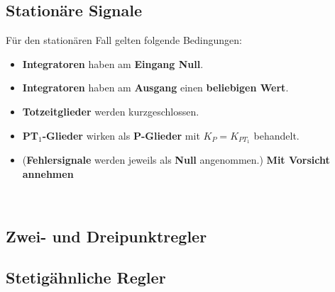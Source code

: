     
    \begin{minipage}{16cm}
    \subsection{Stationäre Signale}
	Für den stationären Fall gelten folgende Bedingungen:
	\begin{itemize}
    	\item \textbf{Integratoren} haben am \textbf{Eingang Null}.
    	\item \textbf{Integratoren} haben am \textbf{Ausgang} einen \textbf{beliebigen Wert}.
    	\item \textbf{Totzeitglieder} werden kurzgeschlossen.
    	\item \textbf{PT$_1$-Glieder} wirken als \textbf{P-Glieder} mit $K_P = K_{PT_1}$ behandelt.
    	\item (\textbf{Fehlersignale} werden jeweils als \textbf{Null} angenommen.) \textbf{Mit Vorsicht annehmen}
  	\end{itemize}
  	\end{minipage} \\


	\subsection{Zwei- und Dreipunktregler}

	\subsection{Stetigähnliche Regler}
